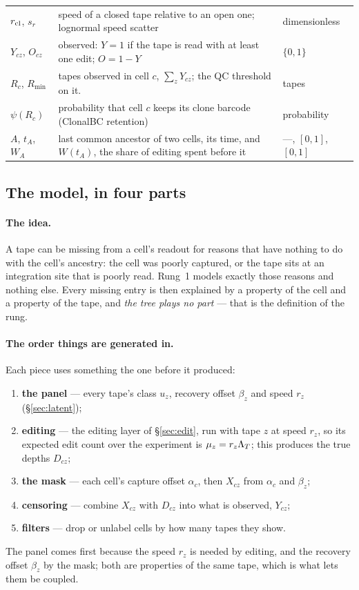 \begin{center}
\begin{tabular}{@{}lp{}l@{}}
$r_{\rm cl}$, $s_r$ & speed of a closed tape relative to an open one; lognormal speed scatter &
      dimensionless \\
$Y_{cz}$, $O_{cz}$ & observed: $Y=1$ if the tape is read with at least one edit; $O=1-Y$ & $\{0,1\}$ \\
$R_c$, $R_{\min}$ & tapes observed in cell $c$, $\sum_zY_{cz}$; the QC threshold on it. & tapes \\
$\psi(R_c)$ & probability that cell $c$ keeps its clone barcode (ClonalBC retention) & probability \\
$A$, $t_A$, $W_A$ & last common ancestor of two cells, its time, and $W(t_A)$, the share of
      editing spent before it & ---, $[0,1]$, $[0,1]$ \\
\bottomrule
\end{tabular}
\end{center}

\subsection{The model, in four parts}\label{sec:drop1-model}

\paragraph{The idea.} A tape can be missing from a cell's readout for reasons that have nothing to
do with the cell's ancestry: the cell was poorly captured, or the tape sits at an integration site
that is poorly read. Rung~1 models exactly those reasons and nothing else. Every missing entry is
then explained by a property of the cell and a property of the tape, and \emph{the tree plays no
part} --- that is the definition of the rung.

\paragraph{The order things are generated in.} Each piece uses something the one before it produced:
\begin{enumerate}
  \item \textbf{the panel} --- every tape's class $u_z$, recovery offset $\beta_z$ and speed $r_z$
        (\S\ref{sec:latent});
  \item \textbf{editing} --- the editing layer of \S\ref{sec:edit}, run with tape $z$ at speed $r_z$,
        so its expected edit count over the experiment is $\mu_z=r_z\Lambda_T$; this produces the true
        depths $D_{cz}$;
  \item \textbf{the mask} --- each cell's capture offset $\alpha_c$, then $X_{cz}$ from $\alpha_c$ and
        $\beta_z$;
  \item \textbf{censoring} --- combine $X_{cz}$ with $D_{cz}$ into what is observed, $Y_{cz}$;
  \item \textbf{filters} --- drop or unlabel cells by how many tapes they show.
\end{enumerate}
The panel comes first because the speed $r_z$ is needed by editing, and the recovery offset
$\beta_z$ by the mask; both are properties of the same tape, which is what lets them be coupled.

